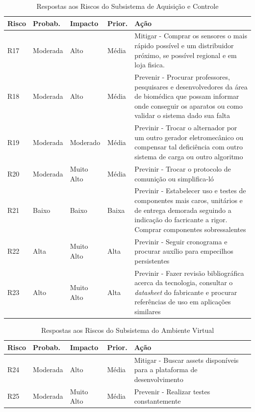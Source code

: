 \begin{table}[H]
\centering
\caption{Respostas aos Riscos do Subsistema de Aquisição e Controle}
\label{respostas-6}
\begin{tabular}{|l|l|l|l|p{9cm}|}
\hline
Risco & Probab.    & Impacto    & Prior. & Ação      \\
\hline


R17 & Moderada & Alto & Média & Mitigar - Comprar os sensores o mais rápido possível e um distribuidor próximo, se possível regional e em loja fisica. \\R18 & Moderada & Alto & Média & Prevenir - Procurar professores, pesquisares e desenvolvedores da área de biomédica que possam informar onde conseguir os aparatos ou como validar o sistema dado sua falta \\
R19 & Moderada & Moderado & Média & Previnir - Trocar o alternador por um outro gerador eletromecânico ou compensar tal deficiência com outro sistema de carga ou outro algoritmo\\
R20 & Moderada & Muito Alto & Média & Previnir - Trocar o protocolo de comunição ou simplifica-ló \\
R21 & Baixo & Baixo & Baixa & Previnir - Estabelecer uso e testes de componentes mais caros, unitários e de entrega demorada seguindo a indicação do facricante a rigor. Comprar componentes sobressalentes\\

R22 & Alta &  Muito Alto & Alta & Previnir - Seguir cronograma e procurar auxílio para empecilhos persistentes \\

R23 & Alto & Muito Alto & Alta & Previnir - Fazer revisão bibliográfica acerca da tecnologia, consultar o \textit{datasheet} do fabricante e procurar referências de uso em aplicações similares \\
\hline

\end{tabular}
\end{table}

\begin{table}[H]
\centering
\caption{Respostas aos Riscos do Subsistema do Ambiente Virtual}
\label{respostas-7}
\begin{tabular}{|l|l|l|l|p{9cm}|}
\hline
Risco & Probab.    & Impacto    & Prior. & Ação      \\
\hline

R24 & Moderada & Alto & Média & Mitigar - Buscar assets disponíveis para a plataforma de desenvolvimento \\
R25 & Moderada & Muito Alto & Média & Prevenir - Realizar testes constantemente \\

\hline
\end{tabular}
\end{table}

